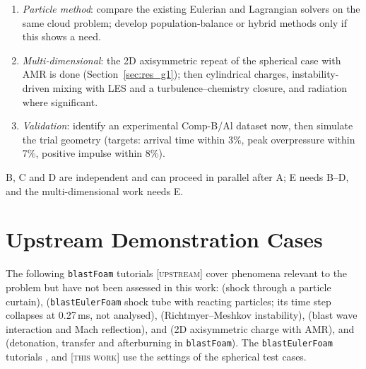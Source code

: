 \documentclass{article}
\newcommand{\up}{\textsc{[upstream]}}
\newcommand{\tw}{\textsc{[this work]}}
\begin{document}
\begin{enumerate}
    \item[F.] \emph{Particle method}: compare the existing Eulerian and Lagrangian solvers on the same cloud problem; develop population-balance or hybrid methods only if this shows a need.
    \item[G.] \emph{Multi-dimensional}: the 2D axisymmetric repeat of the spherical case with AMR is done (Section~\ref{sec:res_g1}); then cylindrical charges, instability-driven mixing with LES and a turbulence--chemistry closure, and radiation where significant.
    \item[H.] \emph{Validation}: identify an experimental Comp-B/Al dataset now, then simulate the trial geometry (targets: arrival time within 3\%, peak overpressure within 7\%, positive impulse within 8\%).
\end{enumerate}
B, C and D are independent and can proceed in parallel after A; E needs B--D, and the multi-dimensional work needs E.

\appendix

\section{Upstream Demonstration Cases}
\label{app:tutorials}

The following \texttt{blastFoam} tutorials \up{} cover phenomena relevant to the problem but have not been assessed in this work:  (shock through a particle curtain),  (\texttt{blastEulerFoam} shock tube with reacting particles; its time step collapses at 0.27\,ms, not analysed),  (Richtmyer--Meshkov instability),  (blast wave interaction and Mach reflection),  and  (2D axisymmetric charge with AMR), and  (detonation, transfer and afterburning in \texttt{blastFoam}). The \texttt{blastEulerFoam} tutorials ,  and  \tw{} use the settings of the spherical test cases.
\end{document}
